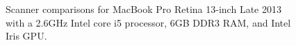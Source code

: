 \begin{figure}[!htb]
\centering
{}


\caption{Scanner comparisons for MacBook Pro Retina 13-inch Late 2013 with a 2.6GHz Intel core i5 processor, 6GB DDR3 RAM, and Intel Iris GPU.
\label{fig:perf-macbook-scanners}}
\end{figure}


